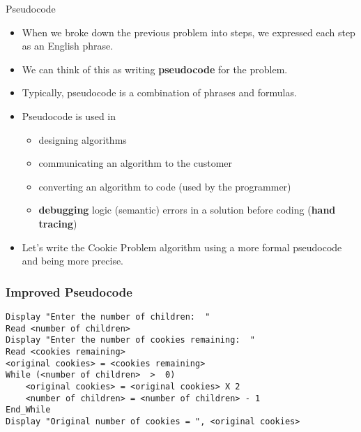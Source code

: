 \documentclass[graphics]{beamer}
\begin{document}
\begin{frame}{Pseudocode}
     {
        \begin{itemize}
            \item When we broke down the previous problem into steps, we expressed each step as an English phrase.
            \item We can think of this as writing \textbf{pseudocode} for the problem.
            \item Typically, pseudocode is a combination of phrases and formulas.
        \end{itemize}
    }
     {
        \begin{itemize}
            \item Pseudocode is used in
            \begin{itemize}
                \item designing algorithms
                \item communicating an algorithm to the customer
                \item converting an algorithm to code (used by the programmer)
                \item \textbf{debugging} logic (semantic) errors in a solution before coding (\textbf{hand tracing})
            \end{itemize}
            \item Let’s write the Cookie Problem algorithm using a more formal pseudocode and being more precise.
        \end{itemize}
    }
\end{frame}

\begin{frame}[fragile]\frametitle{Improved Pseudocode}\label{slide:cookieloop}
    \begin{verbatim}
Display "Enter the number of children:  "
Read <number of children>
Display "Enter the number of cookies remaining:  "
Read <cookies remaining>
<original cookies> = <cookies remaining>
While (<number of children>  >  0)
    <original cookies> = <original cookies> X 2
    <number of children> = <number of children> - 1
End_While
Display "Original number of cookies = ", <original cookies>
    \end{verbatim}
\end{frame}
\end{document}
